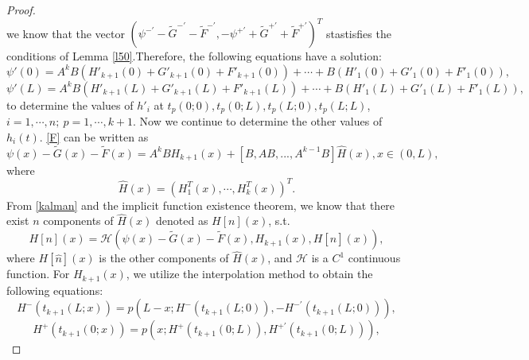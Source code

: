 \documentclass[a4paper,reqno,11pt]{amsart}
\numberwithin{equation}{section} %
\begin{document}
\begin{proof}
$$$$
we know that the vector $(\psi ^{-\prime}-\tilde{G}^{-\prime}-\tilde{F}^{-\prime},-\psi ^{+\prime}+\tilde{G}^{+\prime}+\tilde{F}^{+\prime})^T$ stastisfies the conditions of Lemma \ref{l50}.Therefore, the following equations have a solution:
\begin{equation}\label{c1 continuity at 0}
	\psi  '\left( 0 \right)=A^kB(H'_{k+1}\left( 0\right)+G'_{k+1}\left( 0 \right)+F'_{k+1}\left( 0 \right)) +\cdots + B(H'_1\left( 0 \right)+G'_1\left( 0 \right)+F'_1\left( 0 \right)) ,
\end{equation}
\begin{equation}\label{c1 continuity at L}
	\psi  '\left( L \right)=A^kB(H'_{k+1}\left( L \right)+G'_{k+1}\left( L \right)+F'_{k+1}\left( L \right)) +\cdots + B(H'_1\left( L \right)+G'_1\left( L \right)+F'_1\left( L \right)) ,
\end{equation}
to determine the values of $h'_i$ at $t_p(0;0),t_p(0;L),t_p(L;0),t_p(L;L)$,$i=1,\cdots,n;\ p=1,\cdots,k+1$.
Now we continue to determine the other values of $h_i(t)$. \eqref{F} can be written as
\begin{equation}\label{G}
\psi \left( x \right) -\tilde{G}\left( x \right) -\tilde{F}\left( x \right) =A^kBH_{k+1}\left( x \right) +\left[ B,AB,...,A^{k-1}B \right] \hat{H}(x), x\in \left( 0,L \right) ,
\end{equation}
where 
$$
\hat{H}(x)=\left( H^T_1\left( x \right) ,\cdots ,H^T_k\left( x \right) \right)^T .
$$
From \eqref{kalman} and the implicit function existence theorem, we know that there exist $n$ components of $\hat{H}(x)$ denoted as $H[n](x) $, s.t.
\begin{equation}\label{H}
H\left[ n \right] \left( x \right) =\mathcal{H} \left( \psi \left( x \right) -\tilde{G}\left( x \right) -\tilde{F}\left( x \right) ,H_{k+1}\left( x \right) ,H\left[ \hat{n} \right] \left( x \right) \right) ,
\end{equation}
where $H\left[ \hat{n} \right] \left( x \right)$ is the other components of $\hat{H}(x)$, and $\mathcal{H}$ is a $C^1$ continuous function. For $H_{k+1}\left( x \right) $, we utilize the interpolation method to obtain the following equations:
\begin{equation}\label{polynomial k+1 r}
H^-\left( t_{k+1}\left( L;x \right) \right) =p\left( L-x;H^-\left( t_{k+1}\left( L;0 \right) \right) ,-H^{- \prime}\left( t_{k+1}\left( L;0 \right) \right) \right) ,
\end{equation}
\begin{equation}\label{polynomial k+1 s}
	H^+\left( t_{k+1}\left( 0;x \right) \right) =p\left( x;H^+\left( t_{k+1}\left( 0;L \right) \right) ,H^{+ \prime}\left( t_{k+1}\left( 0;L \right) \right) \right) ,

\end{equation}
\end{proof}
\end{document}
